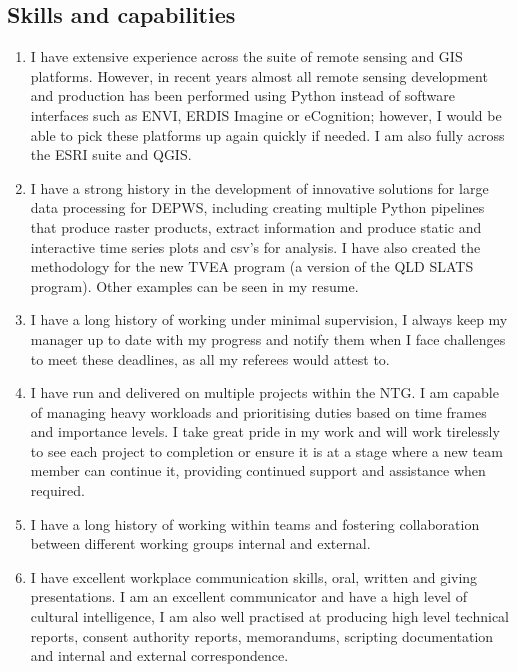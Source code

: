\documentclass[a4paper,11pt]{article}
\begin{document}
\subsection{Skills and capabilities}
\begin{enumerate}

\item I have extensive experience across the suite of remote sensing and GIS platforms. However, in recent years almost all remote sensing development and production has been performed using Python instead of software interfaces such as ENVI, ERDIS Imagine or eCognition; however, I would be able to pick these platforms up again quickly if needed. I am also fully across the ESRI suite and QGIS.

\item I have a strong history in the development of innovative solutions for large data processing for DEPWS, including creating multiple Python pipelines that produce raster products, extract information and produce static and interactive time series plots and csv's for analysis. I have also created the methodology for the new TVEA program (a version of the QLD SLATS program). Other examples can be seen in my resume.

\item I have a long history of working under minimal supervision, I always keep my manager up to date with my progress and notify them when I face challenges to meet these deadlines, as all my referees would attest to.

\item I have run and delivered on multiple projects within the NTG. I am capable of managing heavy workloads and prioritising duties based on time frames and importance levels. I take great pride in my work and will work tirelessly to see each project to completion or ensure it is at a stage where a new team member can continue it, providing continued support and assistance when required.

\item I have a long history of working within teams and fostering collaboration between different working groups internal and external.

\item I have excellent workplace communication skills, oral, written and giving presentations. I am an excellent communicator and have a high level of cultural intelligence, I am also well practised at producing high level technical reports, consent authority reports, memorandums, scripting documentation and internal and external correspondence. 
 \end{enumerate}
\end{document}
